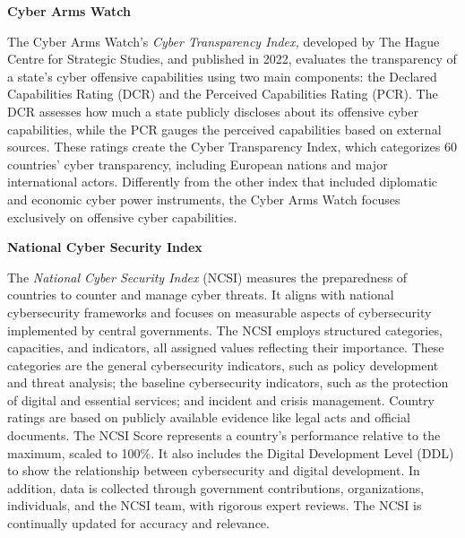 \textbf{Cyber Arms Watch}

The Cyber Arms Watch's \textit{Cyber Transparency Index,} developed by The Hague Centre for Strategic Studies, and published in 2022, evaluates the transparency of a state's cyber offensive capabilities using two main components: the Declared Capabilities Rating (DCR) and the Perceived Capabilities Rating (PCR). The DCR assesses how much a state publicly discloses about its offensive cyber capabilities, while the PCR gauges the perceived capabilities based on external sources. These ratings create the Cyber Transparency Index, which categorizes 60 countries' cyber transparency, including European nations and major international actors. Differently from the other index that included diplomatic and economic cyber power instruments, the Cyber Arms Watch focuses exclusively on offensive cyber capabilities. 


\textbf{National Cyber Security Index}

The \textit{National Cyber Security Index} (NCSI) measures the preparedness of countries to counter and manage cyber threats. It aligns with national cybersecurity frameworks and focuses on measurable aspects of cybersecurity implemented by central governments. The NCSI employs structured categories, capacities, and indicators, all assigned values reflecting their importance. These categories are the general cybersecurity indicators, such as policy development and threat analysis; the baseline cybersecurity indicators, such as the protection of digital and essential services; and incident and crisis management. Country ratings are based on publicly available evidence like legal acts and official documents. The NCSI Score represents a country's performance relative to the maximum, scaled to 100\%. It also includes the Digital Development Level (DDL) to show the relationship between cybersecurity and digital development. In addition, data is collected through government contributions, organizations, individuals, and the NCSI team, with rigorous expert reviews. The NCSI is continually updated for accuracy and relevance.

